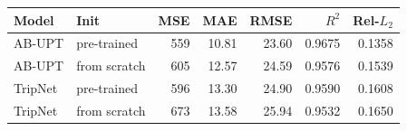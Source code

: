 \begin{tabular}{llrrrrr}
\toprule
Model & Init & MSE & MAE & RMSE & $R^2$ & Rel-$L_2$ \\
\midrule
AB-UPT & pre-trained & 559 & 10.81 & 23.60 & 0.9675 & 0.1358 \\
AB-UPT & from scratch & 605 & 12.57 & 24.59 & 0.9576 & 0.1539 \\
TripNet & pre-trained & 596 & 13.30 & 24.90 & 0.9590 & 0.1608 \\
TripNet & from scratch & 673 & 13.58 & 25.94 & 0.9532 & 0.1650 \\
\bottomrule
\end{tabular}
